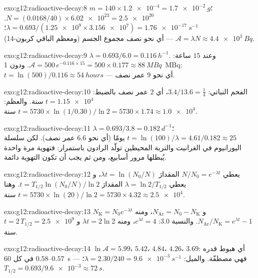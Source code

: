 \begin{solution}{exo:g12:radioactive-decay:8}
$m = 140 \times \num{1.2e-4} = \qty{1.7e-2}{g}$؛
$N = (0.0168/40) \times \num{6.02e23} = \num{2.5e20}$.
$\lambda = 0.693/(\num{1.25e9} \times \num{3.156e7}) =
\qty{1.76e-17}{s^{-1}}$؛ $\mathcal A = \lambda N \approx
\qty{4.4e3}{Bq}$ --- أي نحو نصف مجموع الجسم (ومعظم الباقي
كربون-14).
\end{solution}

\begin{solution}{exo:g12:radioactive-decay:9}
$\lambda = 0.693/6.0 = \qty{0.116}{h^{-1}}$. وعند $15$ ساعة:
$\mathcal A = 500\,e^{-0.116 \times 15} = 500 \times 0.177 \approx
\qty{88}{MBq}$. ودون \qty{1}{MBq}:
$t = \ln(500)/0.116 \approx \qty{54}{hours}$ --- أي نحو $9$
عمر نصف.
\end{solution}

\begin{solution}{exo:g12:radioactive-decay:10}
الفحم النباتي: $3.4/13.6 = \tfrac14$، أي $2$ عمر نصف بالضبط:
$t = \num{1.15e4}$ سنة. والعظم:
$t = \num{5730} \times \ln(1/0.30)/\ln 2 = \num{5730} \times 1.74
\approx \num{1.0e4}$ سنة.
\end{solution}

\begin{solution}{exo:g12:radioactive-decay:11}
$\lambda = 0.693/3.8 = \qty{0.182}{d^{-1}}$؛
$t = \ln(100)/\lambda = 4.61/0.182 \approx 25$ يومًا (أي نحو $6.6$
عمر نصف). لكن سلسلة اليورانيوم في الغرانيت والتربة
المحيطين تولّد الرادون باستمرار: فتهوية مرة واحدة يُبطلها
مرور أسابيع، ومن ثم يجب أن تكون التهوية دائمة.
\end{solution}

\begin{solution}{exo:g12:radioactive-decay:12}
يعطي $N/N_0 = e^{-\lambda t}$ المقدارَ $\lambda t = \ln(N_0/N)$، و
يعطي $\lambda = \ln 2/T_{1/2}$ المقدارَ $t = T_{1/2}\ln(N_0/N)/\ln 2$. وهنا
$t = \num{5730} \times \ln(20)/\ln 2 = \num{5730} \times 4.32
\approx \num{2.5e4}$ سنة.
\end{solution}

\begin{solution}{exo:g12:radioactive-decay:13}
$N_{\mathrm K} = N_0 e^{-\lambda t}$ و
$N_{\mathrm{Ar}} = N_0 - N_{\mathrm K}$، ومنه
$N_{\mathrm{Ar}}/N_{\mathrm K} = e^{\lambda t} - 1$. والنسبة $3.0$:
$e^{\lambda t} = 4$، ومنه $\lambda t = 2\ln 2$ و
$t = 2\,T_{1/2} = \num{2.5e9}$ سنة.
\end{solution}

\begin{solution}{exo:g12:radioactive-decay:14}
$\ln \mathcal A = 5.99$، $5.42$، $4.84$، $4.26$، $3.69$: أي هبوط قدره
$0.57$--$0.58$ في كل \qty{60}{s} --- فهي مصطفّة. والميل:
$\lambda = 2.30/240 = \qty{9.6e-3}{s^{-1}}$؛
$T_{1/2} = 0.693/\num{9.6e-3} \approx \qty{72}{s}$.
\end{solution}

